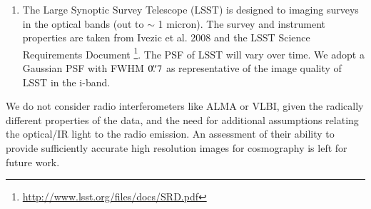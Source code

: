 \documentclass[a4paper,11pt]{article}
\begin{document}
\begin{enumerate}
\item The Large Synoptic Survey Telescope (LSST) is designed to imaging surveys in the optical bands (out to $\sim$ 1 micron). %
The survey and instrument properties are taken from Ivezic et al. 2008 \cite{2008arXiv0805.2366I} and the LSST Science Requirements Document \footnote{\url{http://www.lsst.org/files/docs/SRD.pdf}}. The PSF of LSST will vary over time. We adopt a Gaussian PSF with FWHM $0\hbox{$.\!\!^{\prime\prime}$}7$ as representative of the image quality of LSST in the i-band.

\end{enumerate}

We do not consider radio interferometers like ALMA or VLBI, given the
radically different properties of the data, and the need for
additional assumptions relating the optical/IR light to the radio
emission. An assessment of their ability to provide sufficiently
accurate high resolution images for cosmography is left for future
work.
\end{document}
